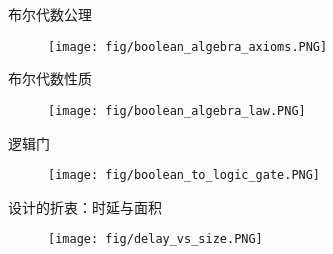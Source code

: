 \documentclass{myslide}
\begin{document}
\begin{frame}{布尔代数公理}
\begin{figure}
\centering
\texttt{[image: fig/boolean\_algebra\_axioms.PNG]}
\end{figure}
\end{frame}

\begin{frame}{布尔代数性质}
\begin{figure}
\centering
\texttt{[image: fig/boolean\_algebra\_law.PNG]}
\end{figure}
\end{frame}

\begin{frame}{逻辑门}
\begin{figure}
\centering
\texttt{[image: fig/boolean\_to\_logic\_gate.PNG]}
\end{figure}
\end{frame}

\begin{frame}{设计的折衷：时延与面积}
\begin{figure}
\centering
\texttt{[image: fig/delay\_vs\_size.PNG]}
\end{figure}
\end{frame}
\end{document}

